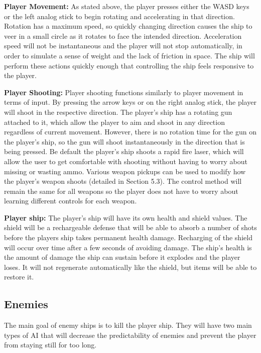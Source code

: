 \documentclass[12pt]{article}       %
\def\hs{\hspace{15pt}}
\begin{document}
	{\bf Player Movement:}	As stated above, the player presses either the WASD keys or the left analog stick to begin rotating and accelerating in that direction. Rotation has a maximum speed, so quickly changing direction causes the ship to veer in a small circle as it rotates to face the intended direction. Acceleration speed will not be instantaneous and the player will not stop automatically, in order to simulate a sense of weight and the lack of friction in space. The ship will perform these actions quickly enough that controlling the ship feels responsive to the player.

	{\bf Player Shooting:} Player shooting functions similarly to player movement in terms of input. By pressing the arrow keys or on the right analog stick, the player will shoot in the respective direction. The player's ship has a rotating gun attached to it, which allow the player to aim and shoot in any direction regardless of current movement. However, there is no rotation time for the gun on the player's ship, so the gun will shoot instantaneously in the direction that is being pressed. Be default the player's ship shoots a rapid fire laser, which will allow the user to get comfortable with shooting without having to worry about missing or wasting ammo. Various weapon pickups can be used to modify how the player's weapon shoots (detailed in Section 5.3). The control method will remain the same for all weapons so the player does not have to worry about learning different controls for each weapon.

	{\bf Player ship:} The player's ship will have its own health and shield values. The shield will be a rechargeable defense that will be able to absorb a number of shots before the players ship takes permanent health damage. Recharging of the shield will occur over time after a few seconds of avoiding damage. The ship's health is the amount of damage the ship can sustain before it explodes and the player loses. It will not regenerate automatically like the shield, but items will be able to restore it.

\subsection{Enemies} %

	\hs {\bf Enemies: } The main goal of enemy ships is to kill the player ship. They will have two main types of AI that will decrease the predictability of enemies and prevent the player from staying still for too long. \\
\end{document}

